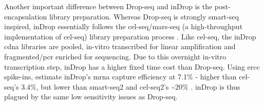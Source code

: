 Another important difference between Drop-seq and inDrop is the post-encapsulation library preparation. Whereas Drop-seq is strongly \acrshort{smart-seq} inspired, inDrop essentially follows the \acrshort{cel-seq}/\acrshort{mars-seq} (a high-throughput implementation of \acrshort{cel-seq}) library preparation process \citep{hashimshony2012, jaitin2014}. Like \acrshort{cel-seq}, the inDrop \acrshort{cdna} libraries are pooled, in-vitro transcribed for linear amplification and fragmented/\acrshort{pcr} enriched for sequencing. Due to this overnight in-vitro transcription step, inDrop has a higher fixed time cost than Drop-seq. Using \acrshort{ercc} spike-ins, \citeauthor{klein2015} estimate inDrop's \acrshort{mrna} capture efficiency at 7.1\% - higher than \acrshort{cel-seq}'s 3.4\%, but lower than \acrshort{smart-seq}2 and \acrshort{cel-seq}2's \textasciitilde{}20\% \citep{klein2015, grun2014, picelli2013, hashimshony2016}. inDrop is thus plagued by the same low sensitivity issues as Drop-seq.\pms


